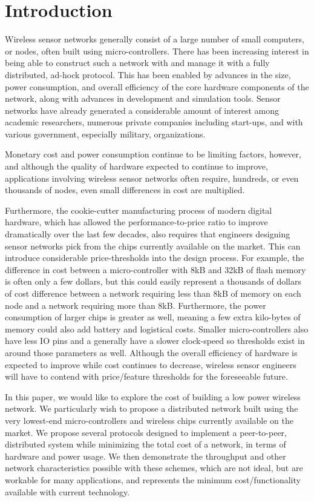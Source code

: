 \section{Introduction}

Wireless sensor networks generally consist of a large number of small computers, or nodes, often built using micro-controllers.
There has been increasing interest in being able to construct such a network with and manage it with a fully distributed,
ad-hock protocol.  This has been enabled by advances in the size, power consumption, and overall efficiency of the
core hardware components of the network, along with advances in development and simulation tools.  Sensor networks have
already generated a considerable amount of interest among academic researchers, numerous private companies including
start-ups, and with various government, especially military, organizations.

Monetary cost and power consumption continue to be limiting factors, however, and although the quality of hardware expected to
continue to improve, applications involving wireless sensor networks often require, hundreds, or even thousands of nodes,
even small differences in cost are multiplied.

Furthermore, the cookie-cutter manufacturing process of modern digital hardware, which has allowed the performance-to-price
ratio to improve dramatically over the last few decades, also requires that engineers designing sensor networks pick from
the chips currently available on the market.  This can introduce considerable price-thresholds into the design process.
For example, the difference in cost
between a micro-controller with 8kB and 32kB of flash memory is often only a few dollars, but this could easily represent a
thousands of dollars of cost difference between a network requiring less than 8kB of memory on each node and a network
requiring more than 8kB.  Furthermore, the power consumption of larger chips is greater as well, meaning a few extra
kilo-bytes of memory could also add battery and logistical costs.  Smaller micro-controllers also have less IO pins and
a generally have a slower clock-speed so thresholds exist in around those parameters as well.  Although the overall efficiency of
hardware is expected to improve while cost continues to decrease, wireless sensor engineers will have to contend with price/feature
thresholds for the foreseeable future.

In this paper, we would like to explore the cost of building a low power wireless network.  We particularly wish to
propose a distributed network built using the very lowest-end micro-controllers and wireless chips currently available on the market.
We propose several protocols designed to implement a peer-to-peer, distributed system while minimizing the total cost
of a network, in terms of hardware and power usage.  We then demonstrate the throughput and
other network characteristics possible with these schemes, which are not ideal, but are workable for many applications, and
represents the minimum cost/functionality available with current technology.

